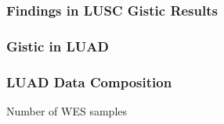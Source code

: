 \documentclass{beamer}
\begin{document}
    \begin{frame}
        \frametitle{Findings in LUSC Gistic Results}
    \end{frame}

    \subsubsection{Gistic in LUAD}
    \begin{frame}
        \frametitle{LUAD Data Composition}

        \begin{table}
            \caption{Number of WES samples}
            \resizebox{!}{0.3 \textheight}
            {}
        \end{table}
    \end{frame}
\end{document}
